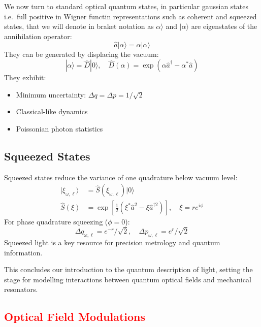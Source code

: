 We now turn to standard optical quantum states, in particular gaussian states i.e.\ full positive in Wigner functin representations such as coherent and squeezed states, that we will denote in braket notation as $\alpha\rangle$ and  $|\alpha\rangle$ are eigenstates of the annihilation operator:
\begin{equation}
\hat{a}|\alpha\rangle = \alpha|\alpha\rangle
\end{equation}
They can be generated by displacing the vacuum:
\begin{equation}
|\alpha\rangle = \hat{D}|0\rangle, \quad \hat{D}(\alpha) = \exp(\alpha \hat{a}^\dagger - \alpha^* \hat{a})
\end{equation}
They exhibit:
\begin{itemize}
  \item Minimum uncertainty: $\Delta q = \Delta p = 1/\sqrt{2}$
  \item Classical-like dynamics
  \item Poissonian photon statistics
\end{itemize}

\subsection*{Squeezed States}

Squeezed states reduce the variance of one quadrature below vacuum level:
\begin{align}
|\xi_{\omega,\ell}\rangle &= \hat{S}(\xi_{\omega,\ell}) |0\rangle \\
\hat{S}(\xi) &= \exp\left[\frac{1}{2}(\xi^* \hat{a}^2 - \xi \hat{a}^{\dagger 2})\right], \quad \xi = r e^{i\phi}
\end{align}
For phase quadrature squeezing ($\phi = 0$):
\begin{equation}
\Delta q_{\omega,\ell} = e^{-r}/\sqrt{2}, \quad \Delta p_{\omega,\ell} = e^{r}/\sqrt{2}
\end{equation}
Squeezed light is a key resource for precision metrology and quantum information.


\vspace{1em}
This concludes our introduction to the quantum description of light, setting the stage for modelling interactions between quantum optical fields and mechanical resonators.

\subsection{\textcolor{red}{Optical Field Modulations}}

